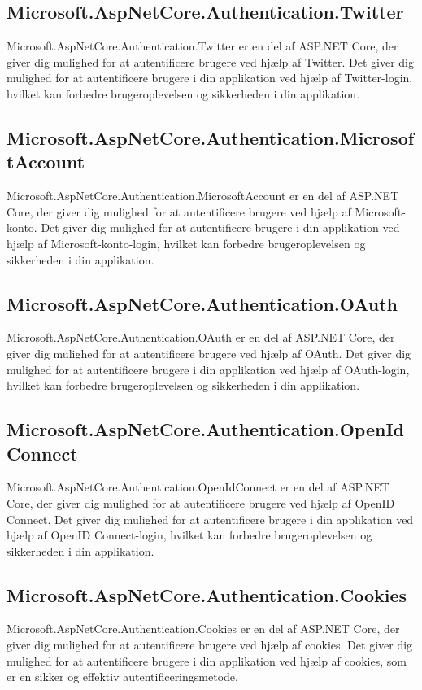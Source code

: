 \subsection{Microsoft.AspNetCore.Authentication.Twitter}
Microsoft.AspNetCore.Authentication.Twitter er en del af ASP.NET Core, der giver dig mulighed for at autentificere brugere ved hjælp af Twitter. Det giver dig mulighed for at autentificere brugere i din applikation ved hjælp af Twitter-login, hvilket kan forbedre brugeroplevelsen og sikkerheden i din applikation.

\subsection{Microsoft.AspNetCore.Authentication.MicrosoftAccount}
Microsoft.AspNetCore.Authentication.MicrosoftAccount er en del af ASP.NET Core, der giver dig mulighed for at autentificere brugere ved hjælp af Microsoft-konto. Det giver dig mulighed for at autentificere brugere i din applikation ved hjælp af Microsoft-konto-login, hvilket kan forbedre brugeroplevelsen og sikkerheden i din applikation.

\subsection{Microsoft.AspNetCore.Authentication.OAuth}
Microsoft.AspNetCore.Authentication.OAuth er en del af ASP.NET Core, der giver dig mulighed for at autentificere brugere ved hjælp af OAuth. Det giver dig mulighed for at autentificere brugere i din applikation ved hjælp af OAuth-login, hvilket kan forbedre brugeroplevelsen og sikkerheden i din applikation.

\subsection{Microsoft.AspNetCore.Authentication.OpenIdConnect}
Microsoft.AspNetCore.Authentication.OpenIdConnect er en del af ASP.NET Core, der giver dig mulighed for at autentificere brugere ved hjælp af OpenID Connect. Det giver dig mulighed for at autentificere brugere i din applikation ved hjælp af OpenID Connect-login, hvilket kan forbedre brugeroplevelsen og sikkerheden i din applikation.

\subsection{Microsoft.AspNetCore.Authentication.Cookies}
Microsoft.AspNetCore.Authentication.Cookies er en del af ASP.NET Core, der giver dig mulighed for at autentificere brugere ved hjælp af cookies. Det giver dig mulighed for at autentificere brugere i din applikation ved hjælp af cookies, som er en sikker og effektiv autentificeringsmetode.
